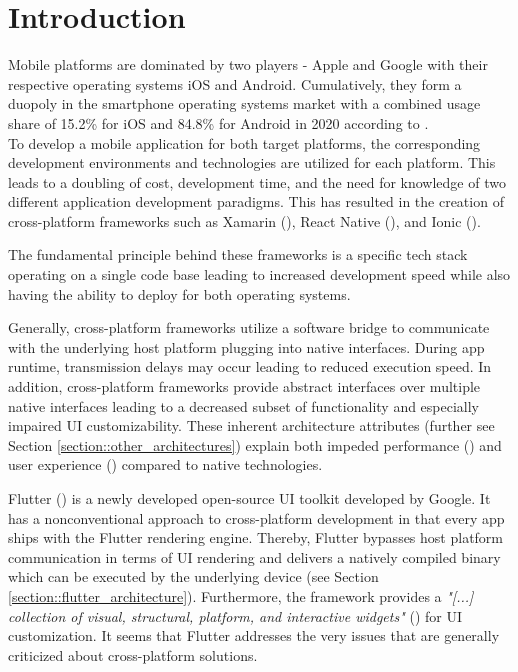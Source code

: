 \chapter{Introduction}
\label{section:introduction}
Mobile platforms are dominated by two players - Apple and Google with their respective operating systems iOS and Android. 
Cumulatively, they form a duopoly in the smartphone operating systems market with a combined usage share of 
15.2\% for iOS and 84.8\% for Android in 2020 according to \textcite{IDC2021}.
\\To develop a mobile application for both target platforms, the corresponding development environments and technologies 
are utilized for each platform. This leads to a doubling of cost, development time, and 
the need for knowledge of two different application development paradigms. 
This has resulted in the creation of cross-platform frameworks such as Xamarin (\cite{Xamarin2021}), React Native (\cite{Facebook2021}), and Ionic (\cite{Ionic2021}). 

The fundamental principle behind these frameworks is a specific tech stack operating on a single code base leading to increased development speed
while also having the ability to deploy for both operating systems.

Generally, cross-platform frameworks utilize a software bridge to communicate with the underlying host platform plugging into 
native interfaces. During app runtime, transmission delays may occur leading to reduced execution speed. In addition, 
cross-platform frameworks provide abstract interfaces over multiple native interfaces leading to a decreased subset of functionality
and especially impaired UI customizability. These inherent architecture attributes (further see Section \ref{section::other_architectures}) explain
both impeded performance (\cite{Ebone2018}) and user experience (\cite{Mercado2016}) compared to native technologies. 

Flutter (\cite{FlutterDev20}) is a newly developed open-source UI toolkit developed by Google. 
It has a nonconventional approach to cross-platform development in that every app ships with the Flutter rendering engine. 
Thereby, Flutter bypasses host platform communication in terms of UI rendering and delivers a natively compiled binary 
which can be executed by the underlying device (see Section \ref{section::flutter_architecture}).
Furthermore, the framework provides a \textit{"[...] collection of visual, structural, platform, and interactive widgets"} (\textcite{GoogleWidgets2021}) for UI customization.
It seems that Flutter addresses the very issues that are generally criticized about cross-platform solutions.

